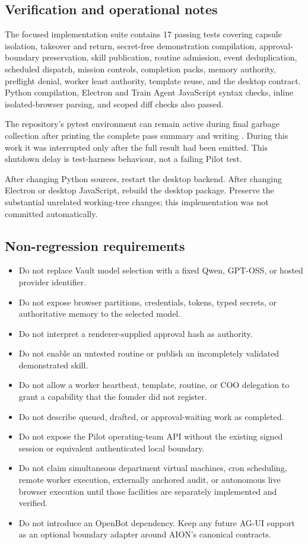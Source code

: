 \subsection{Verification and operational notes}

The focused implementation suite contains 17 passing tests covering capsule
isolation, takeover and return, secret-free demonstration compilation,
approval-boundary preservation, skill publication, routine admission,
event deduplication, scheduled dispatch, mission controls, completion packs,
memory authority, preflight denial, worker least authority, template reuse,
and the desktop contract.  Python compilation, Electron and Train Agent
JavaScript syntax checks, inline isolated-browser parsing, and scoped diff
checks also passed.

The repository's pytest environment can remain active during final garbage
collection after printing the complete pass summary and writing
.  During this work it was interrupted only
after the full result had been emitted.  This shutdown delay is test-harness
behaviour, not a failing Pilot test.

After changing Python sources, restart the desktop backend.  After changing
Electron or desktop JavaScript, rebuild the desktop package.  Preserve the
substantial unrelated working-tree changes; this implementation was not
committed automatically.

\subsection{Non-regression requirements}

\begin{itemize}[leftmargin=*]
\item Do not replace Vault model selection with a fixed Qwen, GPT-OSS, or hosted
provider identifier.
\item Do not expose browser partitions, credentials, tokens, typed secrets, or
authoritative memory to the selected model.
\item Do not interpret a renderer-supplied approval hash as authority.
\item Do not enable an untested routine or publish an incompletely validated
demonstrated skill.
\item Do not allow a worker heartbeat, template, routine, or COO delegation to
grant a capability that the founder did not register.
\item Do not describe queued, drafted, or approval-waiting work as completed.
\item Do not expose the Pilot operating-team API without the existing signed
session or equivalent authenticated local boundary.
\item Do not claim simultaneous department virtual machines, cron scheduling,
remote worker execution, externally anchored audit, or autonomous live browser
execution until those facilities are separately implemented and verified.
\item Do not introduce an OpenBot dependency.  Keep any future AG-UI support as
an optional boundary adapter around AION's canonical contracts.
\end{itemize}
